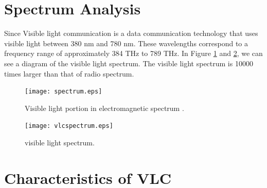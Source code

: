 %
%
%


\section {Spectrum Analysis}
Since Visible light communication is a data communication technology that uses visible light between 380 nm and 780 nm. These wavelengths correspond to a frequency range of approximately 384 THz to 789 THz. In Figure \ref{mux} and \ref{vlc}, we can see a diagram of the visible light spectrum. The visible light spectrum is 10000 times larger than that of radio spectrum.	

\begin{figure}[h]
\begin{center}
\texttt{[image: spectrum.eps]}
\caption{Visible light portion in electromagnetic spectrum \cite{r17}.} \label{mux}
\end{center}
\end{figure}

\begin{figure}[h]
\begin{center}
\texttt{[image: vlcspectrum.eps]}
\caption{visible light spectrum.} \label{vlc}
\end{center}
\end{figure}

\pagebreak

\section {Characteristics of VLC}

